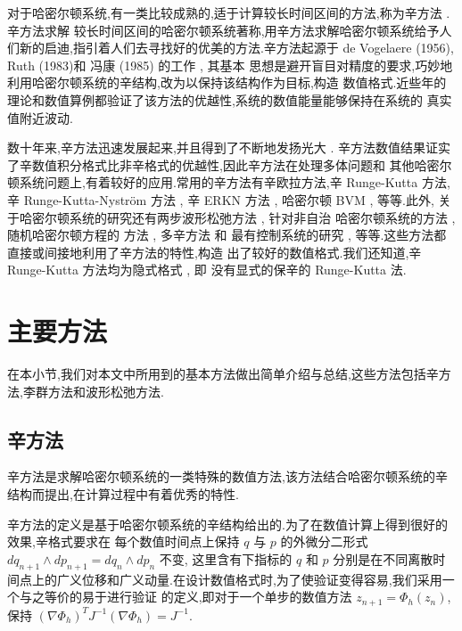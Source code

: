 对于哈密尔顿系统,有一类比较成熟的,适于计算较长时间区间的方法,称为辛方法 \cite{feng2010symplectic}. 辛方法求解
较长时间区间的哈密尔顿系统著称,用辛方法求解哈密尔顿系统给予人们新的启迪,指引着人们去寻找好的优美的方法.辛方法起源于
de Vogelaere (1956), Ruth (1983)和 冯康 (1985) 的工作 \cite{hairer2006geometric}, 其基本
思想是避开盲目对精度的要求,巧妙地利用哈密尔顿系统的辛结构,改为以保持该结构作为目标,构造
数值格式.近些年的理论和数值算例都验证了该方法的优越性,系统的数值能量能够保持在系统的
真实值附近波动.

数十年来,辛方法迅速发展起来,并且得到了不断地发扬光大 \cite{calvo1994numerical,leimkuhler2004simulating,hong2006multi,yang2009extended,monovasilis2013exponentially,xin2016birkhoffian,michalas2016numerical,liao2016multi}. 辛方法数值结果证实了辛数值积分格式比非辛格式的优越性,因此辛方法在处理多体问题和
其他哈密尔顿系统问题上,有着较好的应用.常用的辛方法有辛欧拉方法,辛 Runge-Kutta 方法,
辛 Runge-Kutta-Nystr{\"o}m 方法 \cite{kalogiratou2014fourth,kalogiratou2015}, 辛 ERKN
方法 \cite{wang2014ahigh}, 哈密尔顿 BVM \cite{brugnano2014multi}, 等等.此外,
关于哈密尔顿系统的研究还有两步波形松弛方法 \cite{hassanzadeh2014two}, 针对非自治
哈密尔顿系统的方法 \cite{hong2000numerical,zhang2010anote}, 随机哈密尔顿方程的
方法 \cite{burrage2014structure,ma2015sto,fan2015using}, 多辛方法 \cite{wang2013multi} 和
最有控制系统的研究 \cite{li2015asym}, 等等.这些方法都直接或间接地利用了辛方法的特性,构造
出了较好的数值格式.我们还知道,辛 Runge-Kutta 方法均为隐式格式 \cite{sanz1988runge}, 即
没有显式的保辛的 Runge-Kutta 法.

\section{主要方法}
在本小节,我们对本文中所用到的基本方法做出简单介绍与总结,这些方法包括辛方法,李群方法和波形松弛方法.

\subsection{辛方法}

辛方法是求解哈密尔顿系统的一类特殊的数值方法,该方法结合哈密尔顿系统的辛结构而提出,在计算过程中有着优秀的特性.

辛方法的定义是基于哈密尔顿系统的辛结构给出的.为了在数值计算上得到很好的效果,辛格式要求在
每个数值时间点上保持 $q$ 与 $p$ 的外微分二形式 $dq_{n+1}\wedge dp_{n+1}=dq_n\wedge dp_n$ 不变, 这里含有下指标的 $q$ 和 $p$
分别是在不同离散时间点上的广义位移和广义动量.在设计数值格式时,为了使验证变得容易,我们采用一个与之等价的易于进行验证
的定义,即对于一个单步的数值方法 $z_{n+1}=\Phi_h(z_n)$, 保持 $(\nabla\Phi_h)^TJ^{-1}(\nabla\Phi_h)=J^{-1}$.

